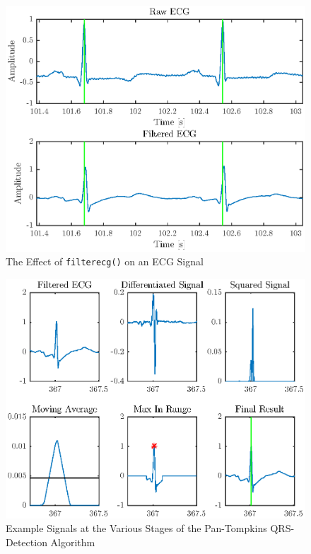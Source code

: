 \documentclass[12pt,letter]{article}
\begin{document}
\begin{figure}[hbtp]
    \centering
    \includegraphics[height=0.44\textheight]{../figures/figures_02}
    \caption{The Effect of \texttt{filterecg()} on an ECG Signal}
    \label{fig:filter}
\end{figure}

\begin{figure}[hbtp]
    \centering
    \includegraphics[height=0.42\textheight]{../figures/figures_03}
    \caption{Example Signals at the Various Stages of the Pan-Tompkins
    QRS-Detection Algorithm}
    \label{fig:qrs}
\end{figure}
\end{document}
